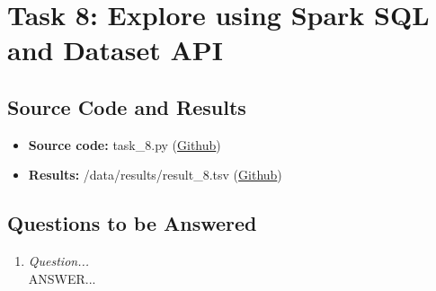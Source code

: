 \documentclass{article}
\begin{document}
\section*{Task 8: Explore using Spark SQL and Dataset API}
\subsection*{Source Code and Results}
    \begin{itemize}
        \item \textbf{Source code:} task\_8.py (\href{https://github.com/FredrikBakken/TDT4305_Big-Data-Project/blob/master/PhaseOne/task_8.py}{Github})
        \item \textbf{Results:} /data/results/result\_8.tsv (\href{https://github.com/FredrikBakken/TDT4305_Big-Data-Project/blob/master/PhaseOne/data/results/result_8.tsv}{Github})
    \end{itemize}

\subsection*{Questions to be Answered}
\begin{enumerate}[label=\alph*)]
    \item \textit{Question...}\\
    
    ANSWER...\\ \\
\end{enumerate}
\end{document}
